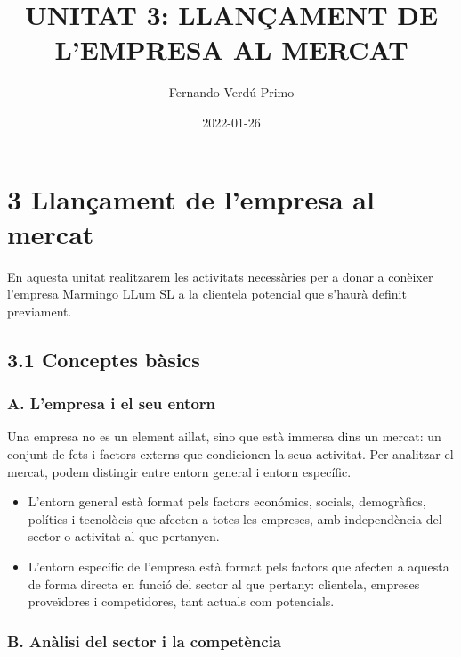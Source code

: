 \documentclass[
]{book}
\title{UNITAT 3: LLANÇAMENT DE L'EMPRESA AL MERCAT}
\author{Fernando Verdú Primo}
\date{2022-01-26}
\begin{document}
\maketitle

\renewcommand*\contentsname{Continguts de la Unitat}
{
\setcounter{tocdepth}{1}
\tableofcontents
}
\hypertarget{llanuxe7ament-de-lempresa-al-mercat}{%
\chapter*{3 Llançament de l'empresa al mercat}\label{llanuxe7ament-de-lempresa-al-mercat}}

En aquesta unitat realitzarem les activitats necessàries per a donar a conèixer l'empresa Marmingo LLum SL a la clientela potencial que s'haurà definit previament.

\hypertarget{conceptes-buxe0sics}{%
\section*{3.1 Conceptes bàsics}\label{conceptes-buxe0sics}}

\hypertarget{a.-lempresa-i-el-seu-entorn}{%
\subsection*{A. L'empresa i el seu entorn}\label{a.-lempresa-i-el-seu-entorn}}

Una empresa no es un element aillat, sino que està immersa dins un mercat: un conjunt de fets i factors externs que condicionen la seua activitat. Per analitzar el mercat, podem distingir entre entorn general i entorn específic.

\begin{itemize}
\item
  L'entorn general està format pels factors económics, socials, demogràfics, polítics i tecnolòcis que afecten a totes les empreses, amb independència del sector o activitat al que pertanyen.
\item
  L'entorn específic de l'empresa està format pels factors que afecten a aquesta de forma directa en funció del sector al que pertany: clientela, empreses proveïdores i competidores, tant actuals com potencials.
\end{itemize}

\hypertarget{b.-anuxe0lisi-del-sector-i-la-competuxe8ncia}{%
\subsection*{B. Anàlisi del sector i la competència}\label{b.-anuxe0lisi-del-sector-i-la-competuxe8ncia}}
\end{document}
